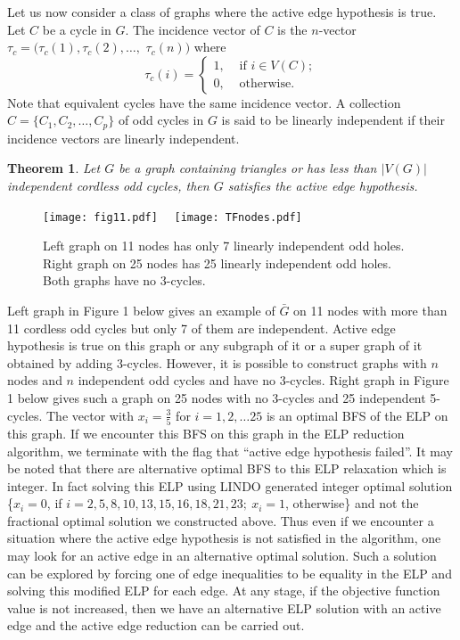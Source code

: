\documentclass[12pt]{article}
\newtheorem{theorem}{Theorem}
\begin{document}
\vskip 10pt

Let us now consider a class of graphs where the active
edge hypothesis is true. Let $C$ be a cycle in $G$. The incidence vector of $C$ is the
$n$-vector $\tau_c= (\tau_c(1),\tau_c(2),\ldots ,$ $\tau_c(n) )$
where
\begin{equation}\tau_c(i) =\begin{cases} 1, & \text{ if $i\in V(C)$};\\
0, & \text{ otherwise}.\end{cases}\end{equation}
\noindent Note that equivalent cycles have the same incidence
vector. A collection $C=\{C_1, C_2, \ldots, C_p\}$ of odd cycles
in $G$ is said to be linearly independent if their incidence
vectors are linearly independent.



\begin{theorem}Let $G$ be a graph containing triangles or has less than $|V(G)|$ independent
cordless odd cycles, then $G$ satisfies the active edge
hypothesis.\end{theorem}

\begin{center}
\begin{figure}
\texttt{[image: fig11.pdf]}  \ \  \texttt{[image: TFnodes.pdf]}
  \caption{Left graph on 11 nodes has only 7 linearly independent odd holes.
  Right graph on 25 nodes has 25 linearly independent odd holes. Both graphs have no 3-cycles.}\label{fig1}
\end{figure}
\end{center}

Left graph in Figure 1 below gives an example of $\bar{G}$ on 11
nodes with more than 11 cordless odd cycles but only 7 of them are
independent. Active edge hypothesis is true on this graph or any
subgraph of it or a super graph of it obtained by adding 3-cycles.
However, it is possible to construct graphs with $n$ nodes and $n$
independent odd cycles and
have no 3-cycles.
Right graph in Figure 1 below gives such a graph on 25 nodes with
no 3-cycles and 25 independent 5-cycles. The vector with $x_i=\frac{3}{5}$
for $i=1,2,\ldots 25$ is an optimal BFS of the ELP on this graph.
If we encounter this BFS on this graph in the ELP reduction
algorithm, we terminate with the flag that ``active edge
hypothesis failed''. It may be noted that there are alternative
optimal BFS to this ELP relaxation which is integer. In fact
solving this  ELP using LINDO generated integer optimal solution
\{$x_i=0$, if $i=2,5,8,10,13,15,16,18,21,23;\ x_i=1$, otherwise\}
and not the fractional optimal solution we constructed above. Thus
even if we encounter a situation where the active edge hypothesis
is not satisfied in the algorithm, one may look for an active edge
in an alternative optimal solution. Such a solution can be
explored by forcing one of edge inequalities to be equality in the
ELP and solving this modified ELP for each edge. At any stage, if
the objective function value is not increased, then we have an
alternative ELP solution with an active
edge and the active edge reduction can be carried out.\\
\end{document}
